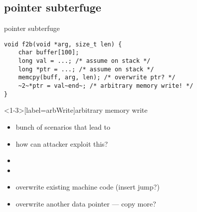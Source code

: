 \subsection{pointer subterfuge}


\begin{frame}[fragile,label=pointerSub]{pointer subterfuge}
\begin{lstlisting}
void f2b(void *arg, size_t len) {
    char buffer[100];
    long val = ...; /* assume on stack */
    long *ptr = ...; /* assume on stack */
    memcpy(buff, arg, len); /* overwrite ptr? */
    ~2~*ptr = val~end~; /* arbitrary memory write! */
}
\end{lstlisting}
\end{frame}

\begin{frame}<1-3>[label=arbWrite]{arbitrary memory write}
    \begin{itemize}
    \item bunch of scenarios that lead to 
    \item how can attacker exploit this?
    \vspace{.5cm}
    \item<2-> 
    \item<2-> 
    \item<2-> overwrite existing machine code (insert jump?)
    \item<2-> overwrite another data pointer --- copy more?
    \end{itemize}
\end{frame}

